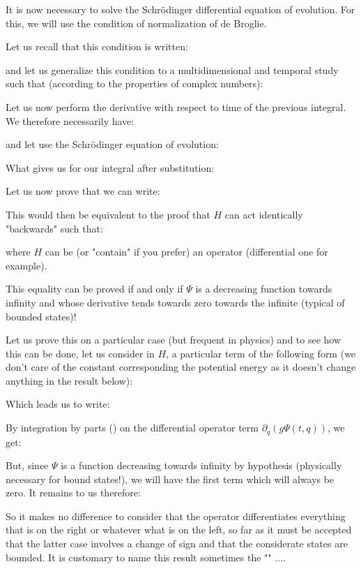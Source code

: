 	It is now necessary to solve the Schrödinger differential equation of evolution. For this, we will use the condition of normalization of de Broglie.

	Let us recall that this condition is written:
	
	and let us generalize this condition to a multidimensional and temporal study such that (according to the properties of complex numbers):
	
	Let us now perform the derivative with respect to time of the previous integral. We therefore necessarily have:
	
	and let use the Schrödinger equation of evolution:
	
	What gives us for our integral after substitution:
	
	Let us now prove that we can write:
	
	This would then be equivalent to the proof that $H$ can act identically "backwards" such that:
	
	where $H$ can be (or "contain" if you prefer) an operator (differential one for example).
	
	This equality can be proved if and only if $\Psi$ is a decreasing function  towards infinity and whose derivative tends towards zero towards the infinite (typical of bounded states)!
	
	Let us prove this on a particular case (but frequent in physics) and to see how this can be done, let us consider in $H$, a particular term of the following form (we don't care of the constant corresponding the potential energy as it doesn't change anything in the result below):
	
	Which leads us to write:
	
	By integration by parts () on the differential operator term $\partial_q (g\Psi(t,q))$, we get:
	
	But, since $\Psi$  is a function decreasing towards infinity by hypothesis (physically necessary for bound states!), we will have the first term which will always be zero. It remains to us therefore:
	
	So it makes no difference to consider that the operator differentiates everything that is on the right or whatever what is on the left, so far as it must be accepted that the latter case involves a change of sign and that the considerate states are bounded. It is customary to name this result sometimes the "" ....
	
